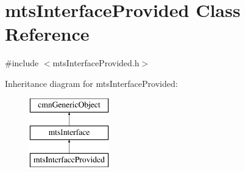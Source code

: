 \hypertarget{classmts_interface_provided}{}\section{mts\+Interface\+Provided Class Reference}
\label{classmts_interface_provided}


{\ttfamily \#include $<$mts\+Interface\+Provided.\+h$>$}

Inheritance diagram for mts\+Interface\+Provided\+:\begin{figure}[H]
\begin{center}
\leavevmode
\includegraphics[height=3.000000cm]{d9/d9d/classmts_interface_provided}
\end{center}
\end{figure}
